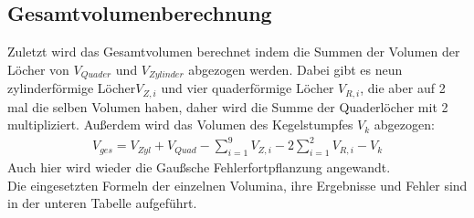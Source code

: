     \subsection{Gesamtvolumenberechnung}
    Zuletzt wird das Gesamtvolumen berechnet indem die Summen der Volumen der Löcher von $V_{Quader}$ und $V_{Zylinder}$ abgezogen werden.
    Dabei gibt es neun zylinderförmige Löcher$V_{Z, i}$ und vier quaderförmige Löcher $V_{R, i}$, die aber auf 2 mal die selben Volumen haben, daher wird die Summe der Quaderlöcher mit 2 multipliziert. Außerdem wird das Volumen des Kegelstumpfes $V_k$ abgezogen:
    \begin{gather}
      V_{ges} = V_{Zyl} + V_{Quad} - \sum_{i=1}^{9} V_{Z, i} - 2 \sum_{i=1}^{2} V_{R, i}-V_k
    \end{gather}
    Auch hier wird wieder die Gaußsche Fehlerfortpflanzung angewandt. \\
\noindent
Die eingesetzten Formeln der einzelnen Volumina, ihre Ergebnisse und Fehler sind in der unteren Tabelle aufgeführt.

